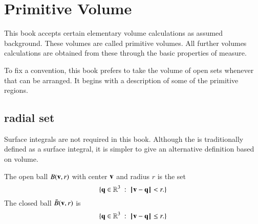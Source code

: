 


\section{Primitive Volume}
%

This book accepts certain elementary volume calculations as assumed
background.  These volumes are called primitive volumes.  All further
volumes calculations are obtained from these through the basic
properties of measure.

To fix a convention, this book prefers to take the volume of open sets
whenever that can be arranged.  It begins with a description of some
of the primitive regions.

\subsection{radial set}\label{sec:solid}

Surface integrals are not required in this book.  Although
the  is traditionally defined as a surface integral,
it is simpler to give an alternative definition based on volume.

\begin{definition}[ball]
 The open ball $B({\mathbf v},r)$ with center ${\mathbf v}$
and radius $r$ is the set
\[ 
\{ \q\in\ring{R}^3 \mid \norm{\v}{\q} < r.\}
\] 
The closed ball $\bar B({\mathbf v},r)$ is
\[ 
\{ \q\in\ring{R}^3 \mid \norm{\v}{\q} \le r.\}
\] 
%
%
%
\end{definition}

